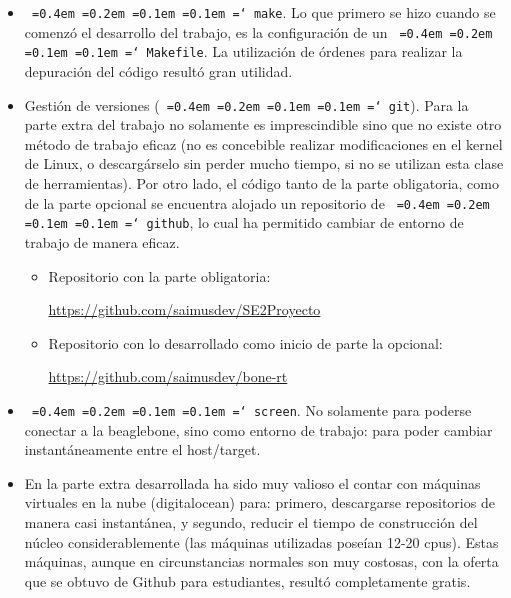 \documentclass[11pt,spanish]{article}
\newcommand*\justify{%
  \fontdimen2\font=0.4em%
  \fontdimen3\font=0.2em%
  \fontdimen4\font=0.1em%
  \fontdimen7\font=0.1em%
  \hyphenchar\font=`\-%
}
\newcommand{\code}[1]{\texttt{\justify #1}}
\begin{document}
\begin{itemize}
	\item \code{make}. Lo que primero se hizo cuando se comenzó	el desarrollo del trabajo, 
	es la configuración de un \code{Makefile}. La utilización de órdenes para realizar 
	la depuración del código resultó gran utilidad.
	\item Gestión de versiones (\code{git}). Para la parte extra del trabajo no solamente 
    es imprescindible sino que no existe otro método de trabajo eficaz (no es concebible realizar 
    modificaciones en el kernel de Linux, o 	descargárselo sin perder mucho tiempo, si no se 
    utilizan esta clase de herramientas).
	Por otro lado, el código tanto de la parte obligatoria, como de la parte opcional 
	se encuentra alojado un repositorio de \code{github}, lo cual ha permitido cambiar de
	entorno de trabajo de manera eficaz.
	\begin{itemize}
		\item Repositorio con la parte obligatoria: 
		
		\url{https://github.com/saimusdev/SE2Proyecto}
		\item Repositorio con lo desarrollado como inicio de parte la opcional:
		
		\url{https://github.com/saimusdev/bone-rt}
	\end{itemize}
	\item \code{screen}. No solamente para poderse conectar a la beaglebone, sino como entorno
	de trabajo: para poder cambiar instantáneamente entre el host/target.
	\item En la parte extra desarrollada ha sido muy valioso el contar con máquinas 	virtuales 
    en la nube (digitalocean) para: primero, descargarse repositorios de manera casi instantánea,
    y segundo, reducir el tiempo de construcción del núcleo considerablemente (las máquinas utilizadas
    poseían 12-20 cpus). Estas máquinas, aunque en circunstancias normales son muy costosas,
    con la oferta que se obtuvo de Github para estudiantes, resultó completamente gratis.
    
\end{itemize}
\end{document}
